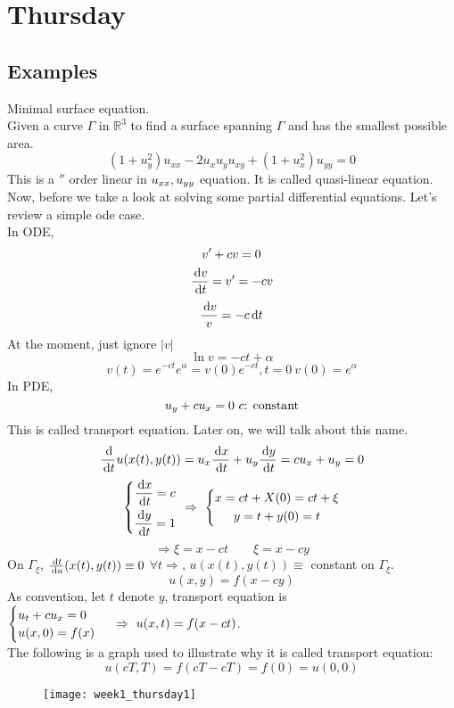
\section{Thursday}
\subsection{Examples}
Minimal surface equation.\\
Given a curve $\Gamma$ in $\mathbb{R}^3$ to find a surface spanning $\Gamma$ and has the smallest possible area.
\[(1+u_y^2)u_{xx}-2u_xu_yu_{xy}+(1+u_x^2)u_{yy}=0
\]
This is a $\second$ order linear in $u_{xx},u_{yy}$ equation. It is called quasi-linear equation.\\
Now, before we take a look at solving some partial differential equations. Let's review a simple ode case.\\
In ODE,
\[v^{\prime}+cv=0
\]
\[\frac{\,\mathrm{d} v}{\,\mathrm{d} t}=v^{\prime}=-cv
\]
\[\frac{\,\mathrm{d} v}{v}=-c\,\mathrm{d} t
\]
At the moment, just ignore $|v|$
\[\ln v=-ct+\alpha
\]
\[v(t)=e^{-ct}e^\alpha=v(0)e^{-ct}, t=0~ v(0)=e^\alpha
\]
In PDE,
\[u_y+cu_x=0 ~c\text{: constant}
\]
This is called transport equation. Later on, we will talk about this name.
\[\frac{\,\mathrm{d}}{\,\mathrm{d} t}u(x(t),y(t))=u_x\frac{\,\mathrm{d} x}{\,\mathrm{d} t}+u_y\frac{\,\mathrm{d} y}{\,\mathrm{d} t}=cu_x+u_y=0
\]
\[\left\{\begin{gathered}\frac{\,\mathrm{d} x}{\,\mathrm{d} t}=c\\\frac{\,\mathrm{d} y}{\,\mathrm{d} t}=1\end{gathered}\right.~\Rightarrow~\left\{\begin{gathered}x=ct+X(0)=ct+\xi\\y=t+y(0)=t\end{gathered}\right.
\]
\[\Rightarrow \xi=x-ct\qquad\xi=x-cy\]
On $\Gamma_\xi$, $\frac{\,\mathrm{d} t}{\,\mathrm{d} u}(x(t),y(t))\equiv0$ $\forall t \Rightarrow$, $u(x(t),y(t))\equiv$ constant on $\Gamma_\xi$.\\
\[u(x,y)=f(x-cy)
\]
As convention, let $t$ denote $y$, transport equation is $\begin{cases}u_t+cu_x=0\\u(x,0)=f(x)\end{cases}~\Rightarrow~u(x,t)=f(x-ct)$.\\
The following is a graph used to illustrate why it is called transport equation:
\[u(cT,T)=f(cT-cT)=f(0)=u(0,0)
\]
\begin{figure}[H]
\centering
\texttt{[image: week1\_thursday1]}
\end{figure}
